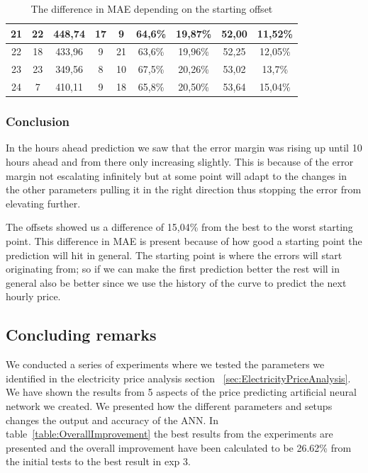 \begin{table}[H]
{\begin{tabular}{|c|c|c|c|c|c|c|c|c|}
	21 & 22  & 448,74 & 17 & 9  & 64,6\% & 19,87\% & 52,00 & 11,52\% \\ \hline
	22 & 18  & 433,96 & 9  & 21 & 63,6\% & 19,96\% & 52,25 & 12,05\% \\ \hline
	23 & 23  & 349,56 & 8  & 10 & 67,5\% & 20,26\% & 53,02 & 13,7\% \\ \hline
	24 & 7   & 410,11 & 9  & 18 & 65,8\% & 20,50\% & 53,64 & 15,04\% \\ \hline
	\end{tabular}
}
\caption{The difference in MAE depending on the starting offset} %
\label{table:Offsets} %
\end{table}

\subsubsection{Conclusion}
In the hours ahead prediction we saw that the error margin was rising up until 10 hours ahead and from there only increasing slightly. This is because of the error margin not escalating infinitely but at some point will adapt to the changes in the other parameters pulling it in the right direction thus stopping the error from elevating further.

The offsets showed us a difference of 15,04\% from the best to the worst starting point. This difference in MAE is present because of how good a starting point the prediction will hit in general. The starting point is where the errors will start originating from; so if we can make the first prediction better the rest will in general also be better since we use the history of the curve to predict the next hourly price.

\newpage
\subsection{Concluding remarks}
We conducted a series of experiments where we tested the parameters we identified in the electricity price analysis section ~\ref{sec:ElectricityPriceAnalysis}. We have shown the results from 5 aspects of the price predicting artificial neural network we created. We presented how the different parameters and setups changes the output and accuracy of the ANN. In table~\ref{table:OverallImprovement} the best results from the experiments are presented and the overall improvement have been calculated to be 26.62\% from the initial tests to the best result in exp 3.

